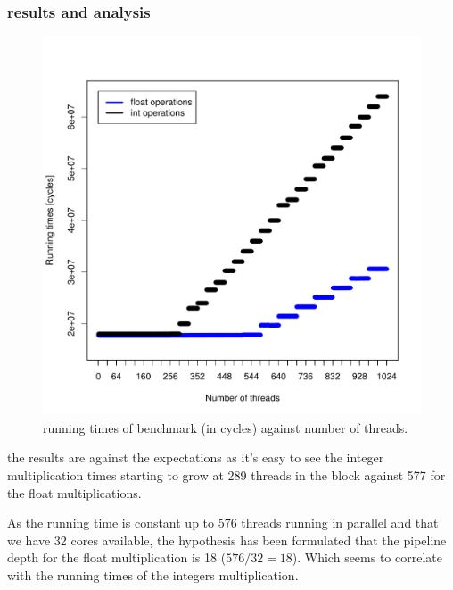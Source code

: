 \documentclass{report}
\def \scalingfactor{.8}
\begin{document}
	\subsubsection{results and analysis}
    \begin{figure}[h]
    	\centering
		\vspace{-20pt}
	    \includegraphics[width=\scalingfactor\linewidth]{"graphics/float_vs_int_running_times"}
		\vspace{-15pt}
		\captionsetup{justification=centering}
        \caption{running times of benchmark (in cycles) against number of threads.}
    \end{figure}
	
    the results are against the expectations as it's easy to see the integer
    multiplication times starting to grow at 289 threads in the block against
    577 for the float multiplications.
    
    As the running time is constant up to 576 threads running in parallel and that we have 32 cores
    available, the hypothesis has been formulated that the pipeline depth for the float multiplication is 18 ($576/32 = 18$). Which seems to correlate with the running
    times of the integers multiplication. 
    
\end{document}
